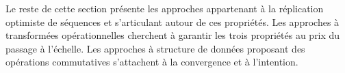 Le reste de cette section présente les approches appartenant à la réplication
optimiste de séquences et s'articulant autour de ces propriétés. Les approches à
transformées opérationnelles cherchent à garantir les trois propriétés au prix
du passage à l'échelle. Les approches à structure de données proposant des
opérations commutatives s'attachent à la convergence et à l'intention.








